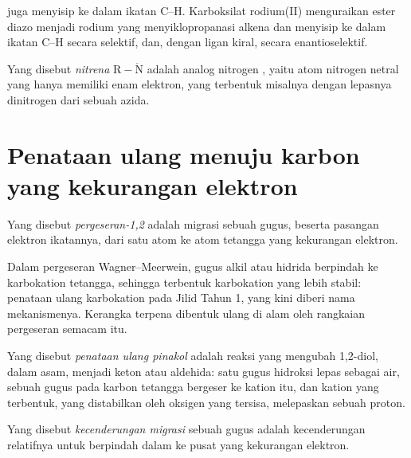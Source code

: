  juga menyisip ke dalam ikatan C--H. Karboksilat rodium(II)
menguraikan ester diazo menjadi  rodium yang menyiklopropanasi alkena dan
menyisip ke dalam ikatan C--H secara selektif, dan, dengan ligan kiral, secara enantioselektif.

\begin{definition}[Nitrena]\label{def:b3:radicals-carbenes:nitrene}
Yang disebut \emph{nitrena} $\mathrm{R{-}\ddot N}$ adalah analog nitrogen , yaitu atom
nitrogen netral yang hanya memiliki enam elektron, yang terbentuk misalnya dengan lepasnya
dinitrogen dari sebuah azida.
\end{definition}

\section{Penataan ulang menuju karbon yang kekurangan elektron}

\begin{definition}[Pergeseran-1,2]\label{def:b3:radicals-carbenes:shift}
Yang disebut \emph{pergeseran-1,2} adalah migrasi sebuah gugus, beserta pasangan
elektron ikatannya, dari satu atom ke atom tetangga yang kekurangan elektron.
\end{definition}

Dalam pergeseran Wagner--Meerwein, gugus alkil atau hidrida berpindah ke karbokation
tetangga, sehingga terbentuk karbokation yang lebih stabil: penataan ulang karbokation pada
Jilid Tahun 1, yang kini diberi nama mekanismenya. Kerangka terpena dibentuk ulang
di alam oleh rangkaian pergeseran semacam itu.

\begin{definition}\label{def:b3:radicals-carbenes:pinacol}
Yang disebut \emph{penataan ulang pinakol} adalah reaksi yang mengubah 1,2-diol,
dalam asam, menjadi keton atau aldehida: satu gugus hidroksi lepas sebagai air, sebuah
gugus pada karbon tetangga bergeser ke kation itu, dan kation yang terbentuk,
yang distabilkan oleh oksigen yang tersisa, melepaskan sebuah proton.
\end{definition}

\begin{definition}\label{def:b3:radicals-carbenes:migratory}
Yang disebut \emph{kecenderungan migrasi} sebuah gugus adalah
kecenderungan relatifnya untuk berpindah dalam  ke pusat yang kekurangan elektron.
\end{definition}

